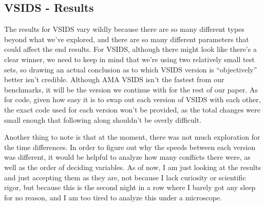 \documentclass[../main.tex]{subfiles}
\begin{document}
\subsection{VSIDS - Results}
The results for VSIDS vary wildly because there are so many different types beyond what 
we've explored, and there are so many different parameters that could affect the end 
results. For VSIDS, although there might look like there's a clear winner, we need to 
keep in mind that we're using two relatively small test sets, so drawing an actual
conclusion as to which VSIDS version is ``objectively'' better isn't credible. 
Although AMA VSIDS isn't the fastest from our benchmarks, it will be the version we 
continue with for the rest of our paper. As for code, given how easy it is to swap out 
each version of VSIDS with each other, the exact code used for each version won't be 
provided, as the total changes were small enough that following along shouldn't be overly
difficult.

Another thing to note is that at the moment, there was not much exploration for the 
time differences. In order to figure out why the speeds between each version was 
different, it would be helpful to analyze how many conflicts there were, as well as the
order of deciding variables. As of now, I am just looking at the results and just 
accepting them as they are, not because I lack curiosity or scientific rigor, but because 
this is the second night in a row where I barely got any sleep for no reason, and I 
am too tired to analyze this under a microscope.
\end{document}
